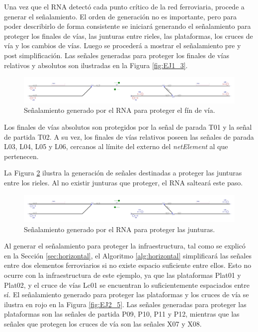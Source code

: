 	Una vez que el RNA detectó cada punto crítico de la red ferroviaria, procede a generar el señalamiento. El orden de generación no es importante, pero para poder describirlo de forma consistente se iniciará generando el señalamiento para proteger los finales de vías, las junturas entre rieles, las plataformas, los cruces de vía y los cambios de vías. Luego se procederá a mostrar el señalamiento pre y post simplificación. Las señales generadas para proteger los finales de vías relativos y absolutos son ilustradas en la Figura \ref{fig:EJ1_3}.

	\begin{figure}[H]
		\centering
		\includegraphics[width=1\textwidth]{resultados-obtenidos/ejemplo2/images/2_step1.png}
		\centering\caption{Señalamiento generado por el RNA para proteger el fín de vía.}
		\label{fig:EJ2_3}
	\end{figure}

	Los finales de vías absolutos son protegidos por la señal de parada T01 y la señal de partida T02. A su vez, los finales de vías relativos poseen las señales de parada L03, L04, L05 y L06, cercanos al límite del externo del \textit{netElement} al que pertenecen.

	La Figura \ref{fig:EJ2_3} ilustra la generación de señales destinadas a proteger las junturas entre los rieles. Al no existir junturas que proteger, el RNA salteará este paso.
	
	\begin{figure}[H]
		\centering
		\includegraphics[width=1\textwidth]{resultados-obtenidos/ejemplo2/images/2_step2.png}
		\centering\caption{Señalamiento generado por el RNA para proteger las junturas.}
		\label{fig:EJ2_3}
	\end{figure}
	
	Al generar el señalamiento para proteger la infraestructura, tal como se explicó en la Sección \ref{sec:horizontal}, el Algoritmo \ref{alg:horizontal} simplificará las señales entre dos elementos ferroviarios si no existe espacio suficiente entre ellos. Esto no ocurre con la infraestructura de este ejemplo, ya que las plataformas Plat01 y Plat02, y el cruce de vías Lc01 se encuentran lo suficientemente espaciados entre sí. El señalamiento generado para proteger las plataformas y los cruces de vía se ilustra en rojo en la Figura \ref{fig:EJ2_5}. Las señales generadas para proteger las plataformas son las señales de partida P09, P10, P11 y P12, mientras que las señales que protegen los cruces de vía son las señales X07 y X08.
	
